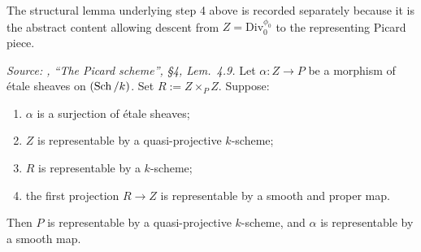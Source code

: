 The structural lemma underlying step 4 above is recorded separately
because it is the abstract content allowing descent from
\(Z = \mathrm{Div}^{\phi_0}_0\) to the representing Picard piece.

\begin{lemma}
  \label{mk-lem:smooth_proper_quotient}
  \leanok

  \textit{Source: \cite{kleiman-picard}, ``The Picard scheme'', \S 4, Lem.~4.9.}
  Let \(\alpha : Z \to P\) be a morphism of \'etale sheaves on \((\operatorname{Sch}/k)\).
  Set \(R := Z \times_P Z\). Suppose:
  \begin{enumerate}
    \item \(\alpha\) is a surjection of \'etale sheaves;
    \item \(Z\) is representable by a quasi-projective \(k\)-scheme;
    \item \(R\) is representable by a \(k\)-scheme;
    \item the first projection \(R \to Z\) is representable by a smooth
      and proper map.
  \end{enumerate}
  Then \(P\) is representable by a quasi-projective \(k\)-scheme, and \(\alpha\)
  is representable by a smooth map.
\end{lemma}

